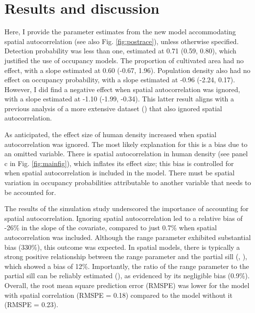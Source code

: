 \documentclass[
  11pt,
  a4paper,
]{article}
\begin{document}
\section{Results and discussion}\label{results-and-discussion}

Here, I provide the parameter estimates from the new model accommodating spatial autocorrelation (see also Fig. \ref{fig:postrace}), unless otherwise specified. Detection probability was less than one, estimated at 0.71 (0.59, 0.80), which justified the use of occupancy models. The proportion of cultivated area had no effect, with a slope estimated at 0.60 (-0.67, 1.96). Population density also had no effect on occupancy probability, with a slope estimated at -0.96 (-2.24, 0.17). However, I did find a negative effect when spatial autocorrelation was ignored, with a slope estimated at -1.10 (-1.99, -0.34). This latter result aligns with a previous analysis of a more extensive dataset () that also ignored spatial autocorrelation.

As anticipated, the effect size of human density increased when spatial autocorrelation was ignored. The most likely explanation for this is a bias due to an omitted variable. There is spatial autocorrelation in human density (see panel c in Fig. \ref{fig:mainfig}), which inflates its effect size; this bias is controlled for when spatial autocorrelation is included in the model. There must be spatial variation in occupancy probabilities attributable to another variable that needs to be accounted for.

The results of the simulation study underscored the importance of accounting for spatial autocorrelation. Ignoring spatial autocorrelation led to a relative bias of -26\% in the slope of the covariate, compared to just 0.7\% when spatial autocorrelation was included. Although the range parameter exhibited substantial bias (330\%), this outcome was expected. In spatial models, there is typically a strong positive relationship between the range parameter and the partial sill (, ), which showed a bias of 12\%. Importantly, the ratio of the range parameter to the partial sill can be reliably estimated (), as evidenced by its negligible bias (0.9\%). Overall, the root mean square prediction error (RMSPE) was lower for the model with spatial correlation (RMSPE = 0.18) compared to the model without it (RMSPE = 0.23).
\end{document}
